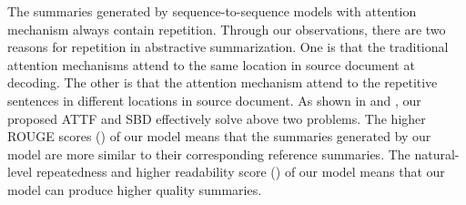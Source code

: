 The summaries generated by sequence-to-sequence models with attention mechanism always contain repetition.  
Through our observations, there are two reasons for repetition in abstractive summarization.
One is that the traditional attention mechanisms attend to the same location in source document at decoding.
The other is that the attention mechanism attend to the repetitive sentences in different locations in source document. 
As shown in  and ,
our proposed ATTF and SBD effectively solve above two problems.  
The higher ROUGE scores () of our model means that
the summaries generated by our model are more similar to their corresponding reference summaries.
The natural-level repeatedness and higher readability score () of our model means 
that our model can produce higher quality summaries\DIFaddbegin {}\DIFaddend .


